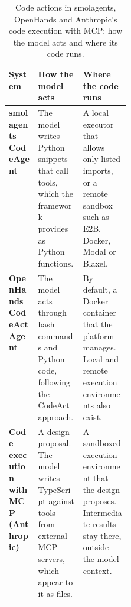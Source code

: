 \begin{table}[t]
  \caption{Code actions in smolagents, OpenHands and Anthropic's code execution with MCP: how the
  model acts and where its code runs.}
  \label{tab:codeact-frameworks}
  \begin{adjustbox}{width=\linewidth}\begin{tabularx}{\linewidth}{L{0.24\linewidth}XX}
    \toprule
    \textbf{System} & \textbf{How the model acts} & \textbf{Where the code runs} \\
    \midrule
    \textbf{smolagents CodeAgent} & The model writes Python snippets that call tools, which the
    framework provides as Python functions. & A local executor that allows only listed imports,
    or a remote sandbox such as E2B, Docker, Modal or Blaxel. \\
    \textbf{OpenHands CodeActAgent} & The model acts through bash commands and Python code,
    following the CodeAct approach. & By default, a Docker container that the platform manages.
    Local and remote execution environments also exist. \\
    \textbf{Code execution with MCP (Anthropic)} & A design proposal. The model writes TypeScript
    against tools from external MCP servers, which appear to it as files. & A sandboxed execution
    environment that the design proposes. Intermediate results stay there, outside the model
    context. \\
    \bottomrule
  \end{tabularx}\end{adjustbox}
\end{table}

